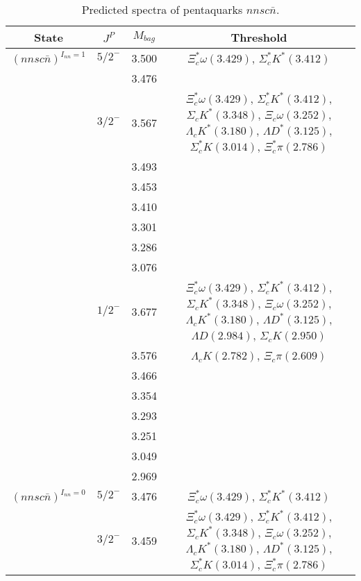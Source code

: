 \documentclass[prd,twocolumn,floatfix,nofootinbib]{revtex4}
\begin{document}
\renewcommand{\tabcolsep}{0.3cm}
\renewcommand{\arraystretch}{1.2}
\begin{table*}[!htbp]
    \caption{Predicted spectra of pentaquarks $nnsc\bar{n}$.}
    \begin{tabular}{cccc}
        \hline\hline
        {\rm State} &$J^{P}$ &$M_{bag}$ &Threshold \\ \hline
        ${(nnsc\bar{n})}^{I_{nn}=1}$
            &${5/2}^{-}$    &3.500  &$\Xi_{c}^{\ast}\omega(3.429)$, $\Sigma_{c}^{\ast}K^{\ast}(3.412)$ \\
            &               &3.476  & \\
            &${3/2}^{-}$    &3.567  &$\Xi_{c}^{\ast}\omega(3.429)$, $\Sigma_{c}^{\ast}K^{\ast}(3.412)$, $\Sigma_{c}K^{\ast}(3.348)$, $\Xi_{c}\omega(3.252)$, $\Lambda_{c}K^{\ast}(3.180)$, $\Lambda D^{\ast}(3.125)$, $\Sigma_{c}^{\ast}K(3.014)$, $\Xi_{c}^{\ast}\pi(2.786)$ \\
            &               &3.493  & \\
            &               &3.453  & \\
            &               &3.410  & \\
            &               &3.301  & \\
            &               &3.286  & \\
            &               &3.076  & \\
            &${1/2}^{-}$    &3.677  &$\Xi_{c}^{\ast}\omega(3.429)$, $\Sigma_{c}^{\ast}K^{\ast}(3.412)$, $\Sigma_{c}K^{\ast}(3.348)$, $\Xi_{c}\omega(3.252)$, $\Lambda_{c}K^{\ast}(3.180)$, $\Lambda D^{\ast}(3.125)$, $\Lambda D(2.984)$, $\Sigma_{c}K(2.950)$ \\
            &               &3.576  &$\Lambda_{c}K(2.782)$, $\Xi_{c}\pi(2.609)$ \\
            &               &3.466  & \\
            &               &3.354  & \\
            &               &3.293  & \\
            &               &3.251  & \\
            &               &3.049  & \\
            &               &2.969  & \\
        ${(nnsc\bar{n})}^{I_{nn}=0}$
            &${5/2}^{-}$    &3.476  &$\Xi_{c}^{\ast}\omega(3.429)$, $\Sigma_{c}^{\ast}K^{\ast}(3.412)$ \\
            &${3/2}^{-}$    &3.459  &$\Xi_{c}^{\ast}\omega(3.429)$, $\Sigma_{c}^{\ast}K^{\ast}(3.412)$, $\Sigma_{c}K^{\ast}(3.348)$, $\Xi_{c}\omega(3.252)$, $\Lambda_{c}K^{\ast}(3.180)$, $\Lambda D^{\ast}(3.125)$, $\Sigma_{c}^{\ast}K(3.014)$, $\Xi_{c}^{\ast}\pi(2.786)$ \\

\end{tabular}
\end{table*}
\end{document}

